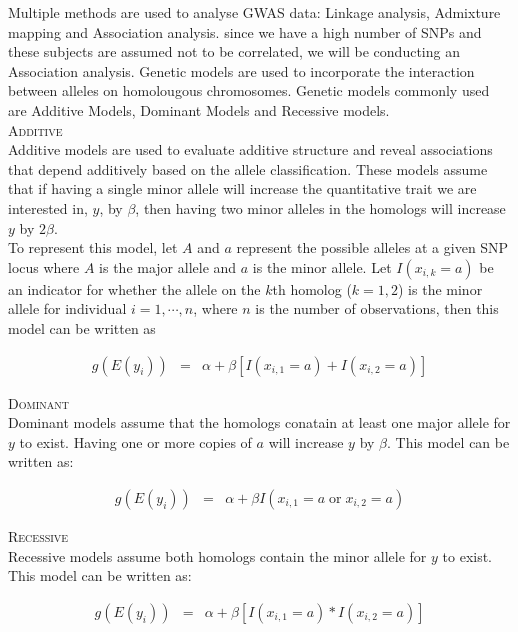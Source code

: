 \documentclass[11pt]{article}\usepackage[]{graphicx}\usepackage[]{color}
\begin{document}
Multiple methods are used to analyse GWAS data: Linkage analysis, Admixture mapping and Association analysis. since we have a high number of SNPs and these subjects are assumed not to be correlated, we will be conducting an Association analysis. Genetic models are used to incorporate the interaction between alleles on homolougous chromosomes. Genetic models commonly used are Additive Models, Dominant Models and Recessive models. \\

\textsc{Additive}\\
Additive models are used to evaluate additive structure and reveal associations that depend additively based on the allele classification. These models assume that if having a single minor allele will increase the quantitative trait we are interested in, $y$, by $\beta$, then having two minor alleles in the homologs will increase $y$ by $2\beta$. \\
To represent this model, let $A$ and $a$ represent the possible alleles at a given SNP locus where $A$ is the major allele and $a$ is the minor allele. Let $I(x_{i,k} = a)$ be an indicator for whether the allele on the $k$th homolog ($k = 1,2$) is the minor allele for individual $i = 1, \cdots, n$, where $n$ is the number of observations, then this model can be written as 

\begin{eqnarray}
g(E(y_i)) &=& \alpha + \beta [I(x_{i,1} = a) + I(x_{i,2} = a)]
\end{eqnarray}

\textsc{Dominant}\\
Dominant models assume that the homologs conatain at least one major allele for $y$ to exist. Having one or more copies of $a$ will increase $y$ by $\beta$. This model can be written as:

\begin{eqnarray}
g(E(y_i)) &=& \alpha + \beta I(x_{i,1} = a \; \text{or} \; x_{i,2} = a)
\end{eqnarray}

\textsc{Recessive}\\
Recessive models assume both homologs contain the minor allele for $y$ to exist. This model can be written as:

\begin{eqnarray}
g(E(y_i)) &=& \alpha + \beta [I(x_{i,1} = a) * I(x_{i,2} = a)]
\end{eqnarray}

\cite[p.~61]{foulkes09}
\end{document}
